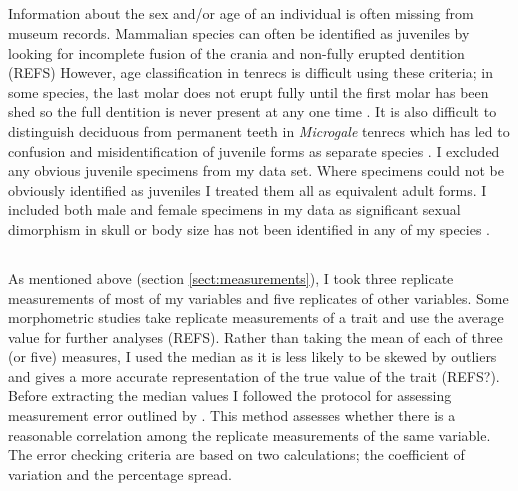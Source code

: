 \subsection{}


	Information about the sex and/or age of an individual is often missing from museum records. Mammalian species can often be identified as juveniles by looking for incomplete fusion of the crania and non-fully erupted dentition (REFS) However, age classification in tenrecs is difficult using these criteria; in some species, the last molar does not erupt fully until the first molar has been shed so the full dentition is never present at any one time \citep{Nowak1983}. It is also difficult to distinguish deciduous from permanent teeth in \textit{Microgale} tenrecs \citep{Asher2008} which has led to confusion and misidentification of juvenile forms as separate species \citep{Olson2004}. I excluded any obvious juvenile specimens from my data set. Where specimens could not be obviously identified as juveniles I treated them all as equivalent adult forms. 	
	I included both male and female specimens in my data as significant sexual dimorphism in skull or body size has not been identified in any of my species \citep[REFS][]{Olson2004}.


\subsection{}
	As mentioned above (section \ref{sect:measurements}), I took three replicate measurements of most of my variables and five replicates of other variables. 
	Some morphometric studies take replicate measurements of a trait and use the average value for further analyses (REFS). Rather than taking the mean of each of three (or five) measures, I used the median as it is less likely to be skewed by outliers and gives a more accurate representation of the true value of the trait (REFS?).
	Before extracting the median values I followed the protocol for assessing measurement error outlined by \citep{Cooper2009}. This method assesses whether there is a reasonable correlation among the replicate measurements of the same variable. The error checking criteria are based on two calculations; the coefficient of variation and the percentage spread.
	
